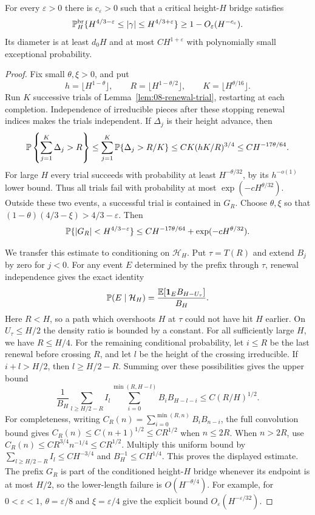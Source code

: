 \begin{theorem}
\label{thm:08-bridge-length}
For every \(\varepsilon>0\) there is \(c_\varepsilon>0\) such that a
critical height-\(H\) bridge satisfies
\[
 \mathbb P_H^{\mathrm{br}}\{H^{4/3-\varepsilon}\le|\gamma|
                         \le H^{4/3+\varepsilon}\}
       \ge1-O_\varepsilon(H^{-c_\varepsilon}).
\]
Its diameter is at least \(d_0H\) and at most \(CH^{1+\varepsilon}\)
with polynomially small exceptional probability.
\end{theorem}
\begin{proof}
Fix small \(\theta,\xi>0\), and put
\[
 h=\lfloor H^{1-\theta}\rfloor,\qquad
 R=\lfloor H^{1-\theta/2}\rfloor,\qquad
 K=\lfloor H^{\theta/16}\rfloor.
\]
Run \(K\) successive trials of Lemma~\ref{lem:08-renewal-trial},
restarting at each completion. Independence of irreducible pieces after
these stopping renewal indices makes the trials independent. If
\(\Delta_j\) is their height advance, then
\[
 \mathbb P\left\{\sum_{j=1}^K\Delta_j>R\right\}
 \le\sum_{j=1}^K\mathbb P\{\Delta_j>R/K\}
 \le CK(hK/R)^{3/4}
 \le CH^{-17\theta/64}.
\]
For large \(H\) every trial succeeds with probability at least
\(H^{-\theta/32}\), by its \(h^{-o(1)}\) lower bound. Thus all trials
fail with probability at most \(\exp(-cH^{\theta/32})\). Outside these
two events, a successful trial is contained in \(G_R\). Choose
\(\theta,\xi\) so that
\((1-\theta)(4/3-\xi)>4/3-\varepsilon\). Then
\[
 \mathbb P\{|G_R|<H^{4/3-\varepsilon}\}
       \le CH^{-17\theta/64}+\exp(-cH^{\theta/32}).
\]

We transfer this estimate to conditioning on \(\mathcal H_H\). Put
\(\tau=T(R)\) and extend \(B_j\) by zero for \(j<0\). For any event
\(E\) determined by the prefix through \(\tau\), renewal independence
gives the exact identity
\[
 \mathbb P(E\mid \mathcal H_H)
    =\frac{\mathbb E[\mathbf1_E B_{H-U_\tau}]}{B_H}.
\]
Here \(R<H\), so a path which overshoots \(H\) at \(\tau\) could not
have hit \(H\) earlier. On \(U_\tau\le H/2\) the density ratio is
bounded by a constant. For all sufficiently large \(H\), we have \(R\le H/4\).
For the remaining conditional probability, let \(i\le R\) be the last
renewal before crossing \(R\), and let \(l\) be the height of the
crossing irreducible. If \(i+l>H/2\), then \(l\ge H/2-R\).
Summing over these possibilities gives the upper bound
\[
 \frac1{B_H}
 \sum_{l\ge H/2-R} I_l
       \sum_{i=0}^{\min(R,H-l)}B_iB_{H-l-i}
 \le C(R/H)^{1/2}.
\]
For completeness, writing
\(C_R(n)=\sum_{i=0}^{\min(R,n)}B_iB_{n-i}\), the full convolution
bound gives \(C_R(n)\le C(n+1)^{1/2}\le CR^{1/2}\) when
\(n\le2R\). When \(n>2R\), use
\(C_R(n)\le CR^{3/4}n^{-1/4}\le CR^{1/2}\).
Multiply this uniform bound by
\(\sum_{l\ge H/2-R}I_l\le CH^{-3/4}\) and
\(B_H^{-1}\le CH^{1/4}\). This proves the displayed estimate.
The prefix \(G_R\) is part of the conditioned height-\(H\) bridge
whenever its endpoint is at most \(H/2\), so the lower-length failure
is \(O(H^{-\theta/4})\). For example, for \(0<\varepsilon<1\),
\(\theta=\varepsilon/8\) and \(\xi=\varepsilon/4\) give the explicit
bound \(O_\varepsilon(H^{-\varepsilon/32})\).


\end{proof}
